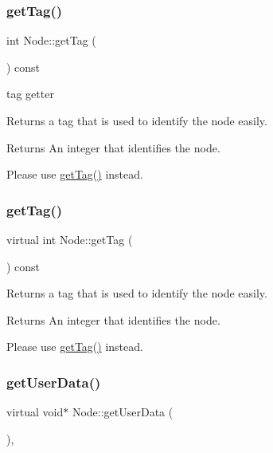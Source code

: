 \subsubsection{\texorpdfstring{get\+Tag()}{getTag()}\hspace{0.1cm}{\footnotesize\ttfamily [1/2]}}
{\footnotesize\ttfamily int Node\+::get\+Tag (\begin{DoxyParamCaption}{ }\end{DoxyParamCaption}) const\hspace{0.3cm}{\ttfamily [virtual]}}



tag getter 

Returns a tag that is used to identify the node easily.

\begin{DoxyReturn}{Returns}
An integer that identifies the node.
\end{DoxyReturn}
Please use {\ttfamily \hyperlink{classNode_a9f18b6db8146f2660e8761bb9557d1fe}{get\+Tag()}} instead. \mbox{\label{classNode_ac148c44055cf3d6344326b5bbb3ccd26}} 
\subsubsection{\texorpdfstring{get\+Tag()}{getTag()}\hspace{0.1cm}{\footnotesize\ttfamily [2/2]}}
{\footnotesize\ttfamily virtual int Node\+::get\+Tag (\begin{DoxyParamCaption}{ }\end{DoxyParamCaption}) const\hspace{0.3cm}{\ttfamily [virtual]}}

Returns a tag that is used to identify the node easily.

\begin{DoxyReturn}{Returns}
An integer that identifies the node.
\end{DoxyReturn}
Please use {\ttfamily \hyperlink{classNode_a9f18b6db8146f2660e8761bb9557d1fe}{get\+Tag()}} instead. \mbox{\label{classNode_afeacb9cc8c8730d3ee8359ef42d5318d}} 
\subsubsection{\texorpdfstring{get\+User\+Data()}{getUserData()}\hspace{0.1cm}{\footnotesize\ttfamily [1/4]}}
{\footnotesize\ttfamily virtual void$\ast$ Node\+::get\+User\+Data (\begin{DoxyParamCaption}{ }\end{DoxyParamCaption})\hspace{0.3cm}{\ttfamily [inline]}, {\ttfamily [virtual]}}

